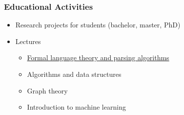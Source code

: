 \documentclass[xcolor=table,aspectratio=169]{beamer}
\begin{document}
\begin{frame}[fragile] \frametitle{Educational Activities}
  \begin{itemize}
  \item Research projects for students (bachelor, master, PhD)
  \item Lectures
  \begin{itemize}
  \item \href{https://github.com/JetBrains-Research/formal-lang-course}{Formal language theory and parsing algorithms}
  \item Algorithms and data structures
  \item Graph theory
  \item Introduction to machine learning
  \end{itemize}
\end{itemize}
\end{frame}
\end{document}
